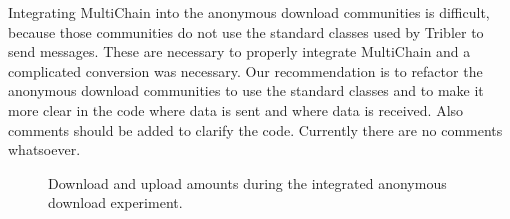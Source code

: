 Integrating MultiChain into the anonymous download communities is difficult,
because those communities do not use the standard classes used by Tribler to send messages.
These are necessary to properly integrate MultiChain and a complicated conversion was necessary.
Our recommendation is to refactor the anonymous download communities to use the standard classes
and to make it more clear in the code where data is sent and where data is received.
Also comments should be added to clarify the code.
Currently there are no comments whatsoever.

\begin{figure}
\centering
{}
\caption{Download and upload amounts during the integrated anonymous download experiment.}
\label{fig:integrated-anonymous-amounts}
\end{figure}